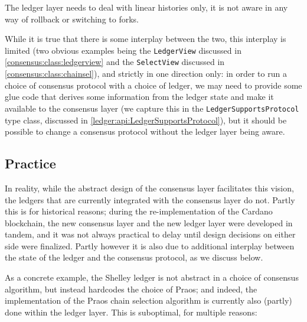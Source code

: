 \begin{itemize}
The ledger layer needs to deal with linear histories only, it is not aware in
any way of rollback or switching to forks.
\end{itemize}

While it is true that there is some interplay between the two, this interplay is
limited (two obvious examples being the \lstinline!LedgerView! discussed in
\cref{consensus:class:ledgerview} and the \lstinline!SelectView! discussed in
\cref{consensus:class:chainsel}), and strictly in one direction only: in order
to run a choice of consensus protocol with a choice of ledger, we may need to
provide some glue code that derives some  information from the ledger state and
make it available to the consensus layer (we capture this in the
\lstinline!LedgerSupportsProtocol! type class, discussed in
\cref{ledger:api:LedgerSupportsProtocol}), but it should be possible to change a
consensus protocol without the ledger layer being aware.

\subsection{Practice}

In reality, while the abstract design of the consensus layer facilitates this
vision, the ledgers that are currently integrated with the consensus layer do
not. Partly this is for historical reasons; during the re-implementation of the
Cardano blockchain, the new consensus layer and the new ledger layer were
developed in tandem, and it was not always practical to delay until design
decisions on either side were finalized. Partly however it is also due to
additional interplay between the state of the ledger and the consensus protocol,
as we discuss below.

As a concrete example, the Shelley ledger is not abstract in a choice of
consensus algorithm, but instead hardcodes the choice of Praos; and indeed,
the implementation of the Praos chain selection algorithm is currently also
(partly) done within the ledger layer. This is suboptimal, for multiple reasons:

